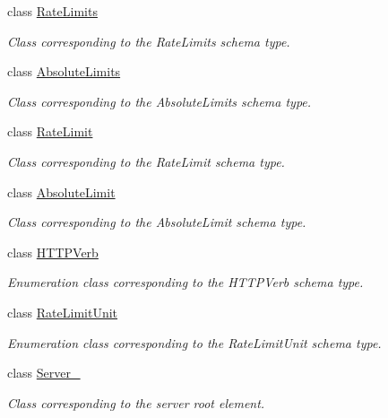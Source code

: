 \begin{DoxyCompactItemize}
class \hyperlink{classopenstack_1_1xml_1_1RateLimits}{RateLimits}
\begin{DoxyCompactList}\small\item\em Class corresponding to the RateLimits schema type. \item\end{DoxyCompactList}\item 
class \hyperlink{classopenstack_1_1xml_1_1AbsoluteLimits}{AbsoluteLimits}
\begin{DoxyCompactList}\small\item\em Class corresponding to the AbsoluteLimits schema type. \item\end{DoxyCompactList}\item 
class \hyperlink{classopenstack_1_1xml_1_1RateLimit}{RateLimit}
\begin{DoxyCompactList}\small\item\em Class corresponding to the RateLimit schema type. \item\end{DoxyCompactList}\item 
class \hyperlink{classopenstack_1_1xml_1_1AbsoluteLimit}{AbsoluteLimit}
\begin{DoxyCompactList}\small\item\em Class corresponding to the AbsoluteLimit schema type. \item\end{DoxyCompactList}\item 
class \hyperlink{classopenstack_1_1xml_1_1HTTPVerb}{HTTPVerb}
\begin{DoxyCompactList}\small\item\em Enumeration class corresponding to the HTTPVerb schema type. \item\end{DoxyCompactList}\item 
class \hyperlink{classopenstack_1_1xml_1_1RateLimitUnit}{RateLimitUnit}
\begin{DoxyCompactList}\small\item\em Enumeration class corresponding to the RateLimitUnit schema type. \item\end{DoxyCompactList}\item 
class \hyperlink{classopenstack_1_1xml_1_1Server__}{Server\_\-}
\begin{DoxyCompactList}\small\item\em Class corresponding to the server root element. \item\end{DoxyCompactList}\item 

\end{DoxyCompactItemize}
